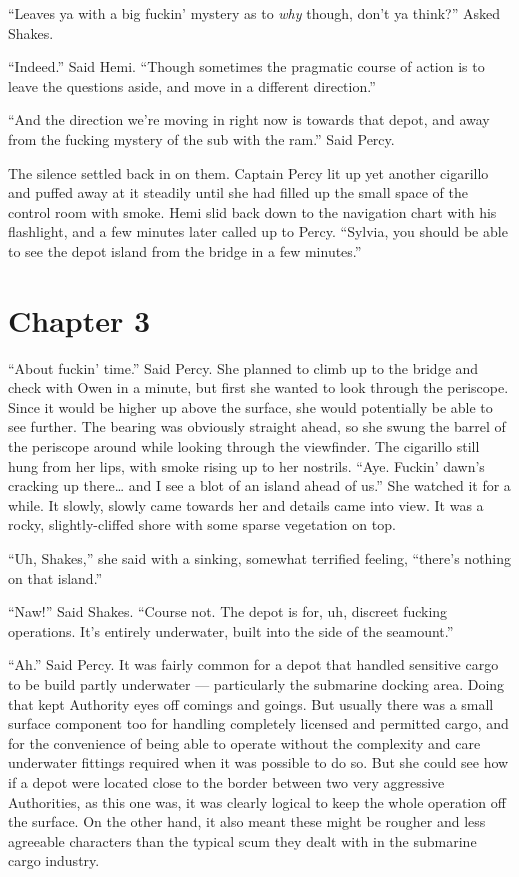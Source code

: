 \documentclass[
]{scrbook}
\begin{document}
``Leaves ya with a big fuckin' mystery as to \emph{why} though, don't ya
think?'' Asked Shakes.

``Indeed.'' Said Hemi. ``Though sometimes the pragmatic course of action
is to leave the questions aside, and move in a different direction.''

``And the direction we're moving in right now is towards that depot, and
away from the fucking mystery of the sub with the ram.'' Said Percy.

The silence settled back in on them. Captain Percy lit up yet another
cigarillo and puffed away at it steadily until she had filled up the
small space of the control room with smoke. Hemi slid back down to the
navigation chart with his flashlight, and a few minutes later called up
to Percy. ``Sylvia, you should be able to see the depot island from the
bridge in a few minutes.''

\hypertarget{chapter-3}{%
\chapter*{Chapter 3}\label{chapter-3}}

``About fuckin' time.'' Said Percy. She planned to climb up to the
bridge and check with Owen in a minute, but first she wanted to look
through the periscope. Since it would be higher up above the surface,
she would potentially be able to see further. The bearing was obviously
straight ahead, so she swung the barrel of the periscope around while
looking through the viewfinder. The cigarillo still hung from her lips,
with smoke rising up to her nostrils. ``Aye. Fuckin' dawn's cracking up
there\ldots{} and I see a blot of an island ahead of us.'' She watched
it for a while. It slowly, slowly came towards her and details came into
view. It was a rocky, slightly-cliffed shore with some sparse vegetation
on top.

``Uh, Shakes,'' she said with a sinking, somewhat terrified feeling,
``there's nothing on that island.''

``Naw!'' Said Shakes. ``Course not. The depot is for, uh, discreet
fucking operations. It's entirely underwater, built into the side of the
seamount.''

``Ah.'' Said Percy. It was fairly common for a depot that handled
sensitive cargo to be build partly underwater --- particularly the
submarine docking area. Doing that kept Authority eyes off comings and
goings. But usually there was a small surface component too for handling
completely licensed and permitted cargo, and for the convenience of
being able to operate without the complexity and care underwater
fittings required when it was possible to do so. But she could see how
if a depot were located close to the border between two very aggressive
Authorities, as this one was, it was clearly logical to keep the whole
operation off the surface. On the other hand, it also meant these might
be rougher and less agreeable characters than the typical scum they
dealt with in the submarine cargo industry.
\end{document}
